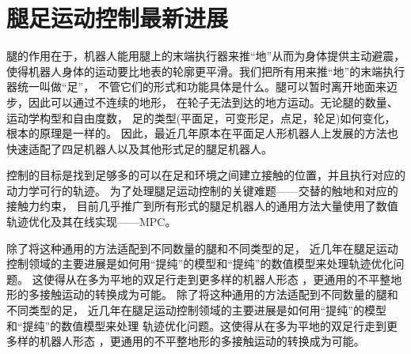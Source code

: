 




\section{腿足运动控制最新进展}
腿的作用在于，机器人能用腿上的末端执行器来推“地”从而为身体提供主动避震，
使得机器人身体的运动要比地表的轮廓更平滑。我们把所有用来推“地”的末端执行器统一叫做“足”，
不管它们的形式和功能具体是什么。腿可以暂时离开地面来迈步，因此可以通过不连续的地形，
在轮子无法到达的地方运动。无论腿的数量、运动学构型和自由度数，
足的类型(平面足，可变形足，点足，轮足)如何变化，根本的原理是一样的。
因此，最近几年原本在平面足人形机器人上发展的方法也快速适配了四足机器人以及其他形式足的腿足机器人。

控制的目标是找到足够多的可以在足和环境之间建立接触的位置，并且执行对应的动力学可行的轨迹。
为了处理腿足运动控制的关键难题——交替的触地和对应的接触力约束，
目前几乎推广到所有形式的腿足机器人的通用方法大量使用了数值轨迹优化及其在线实现——MPC。

除了将这种通用的方法适配到不同数量的腿和不同类型的足，
近几年在腿足运动控制领域的主要进展是如何用“提纯”的模型和“提纯”的数值模型来处理轨迹优化问题。
这使得从在多为平地的双足行走到更多样的机器人形态
，更通用的不平整地形的多接触运动的转换成为可能。
除了将这种通用的方法适配到不同数量的腿和不同类型的足，
近几年在腿足运动控制领域的主要进展是如何用“提纯”的模型和“提纯”的数值模型来处理
轨迹优化问题。这使得从在多为平地的双足行走到更多样的机器人形态
，更通用的不平整地形的多接触运动的转换成为可能。

